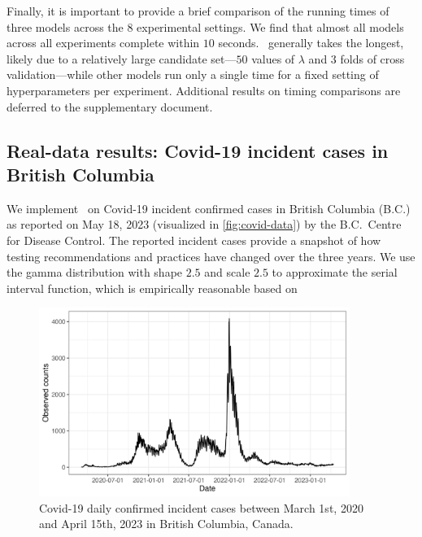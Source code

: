 Finally, it is important to provide a brief comparison of the running times of
three models across the $8$ experimental settings. We find that almost all
models across all experiments complete within $10$ seconds.
\RtEstim\ generally takes the longest, likely due to a relatively large
candidate set---$50$ values of $\lambda$ and 3 folds of cross validation---while
other models run only a single time for a fixed setting of hyperparameters per
experiment. Additional results on timing comparisons are deferred to the
supplementary document. 



\subsection{Real-data results: Covid-19 incident cases in British Columbia}

We implement \RtEstim\ on Covid-19 incident confirmed cases in British Columbia
(B.C.) as reported on May 18, 2023 (visualized in \autoref{fig:covid-data}) by
the B.C.\ Centre for Disease Control. The reported incident cases provide a
snapshot of how testing recommendations and practices have changed over the
three years. We use the gamma distribution with shape $2.5$ and scale $2.5$
to approximate the serial interval function, which is empirically
reasonable based on 

\begin{figure}[tb]
    \centering
    \includegraphics[width=0.9\textwidth]{fig/covid_dat.png}
    \caption{Covid-19 daily confirmed incident cases between March 1st, 2020 and April 15th, 2023 in British Columbia, Canada.} 
    \label{fig:covid-data}
\end{figure} 

